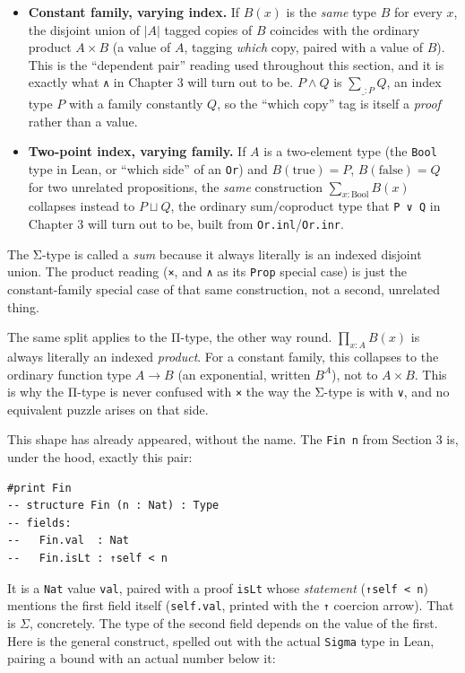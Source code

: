 \begin{itemize}
\tightlist
\item
  \textbf{Constant family, varying index.} If \(B(x)\) is the \emph{same} type \(B\) for every \(x\), the disjoint union of \(|A|\) tagged copies of \(B\) coincides with the ordinary product \(A \times B\) (a value of \(A\), tagging \emph{which} copy, paired with a value of \(B\)). This is the ``dependent pair'' reading used throughout this section, and it is exactly what \texttt{∧} in Chapter 3 will turn out to be. \(P \wedge Q\) is \(\sum_{\_ : P} Q\), an index type \(P\) with a family constantly \(Q\), so the ``which copy'' tag is itself a \emph{proof} rather than a value.
\item
  \textbf{Two-point index, varying family.} If \(A\) is a two-element type (the \texttt{Bool} type in Lean, or ``which side'' of an \texttt{Or}) and \(B(\mathrm{true}) = P\), \(B(\mathrm{false}) = Q\) for two unrelated propositions, the \emph{same} construction \(\sum_{x:\mathrm{Bool}} B(x)\) collapses instead to \(P \sqcup Q\), the ordinary sum/coproduct type that \texttt{P ∨ Q} in Chapter 3 will turn out to be, built from \texttt{Or.inl}/\texttt{Or.inr}.
\end{itemize}

The Σ-type is called a \emph{sum} because it always literally is an indexed disjoint union. The product reading (\texttt{×}, and \texttt{∧} as its \texttt{Prop} special case) is just the constant-family special case of that same construction, not a second, unrelated thing.

The same split applies to the Π-type, the other way round. \(\prod_{x:A} B(x)\) is always literally an indexed \emph{product}. For a constant family, this collapses to the ordinary function type \(A \to B\) (an exponential, written \(B^A\)), not to \(A \times B\). This is why the Π-type is never confused with \texttt{×} the way the Σ-type is with \texttt{∨}, and no equivalent puzzle arises on that side.

This shape has already appeared, without the name. The \texttt{Fin n} from Section 3 is, under the hood, exactly this pair:

\begin{lstlisting}
#print Fin
-- structure Fin (n : Nat) : Type
-- fields:
--   Fin.val  : Nat
--   Fin.isLt : ↑self < n
\end{lstlisting}

It is a \texttt{Nat} value \texttt{val}, paired with a proof \texttt{isLt} whose \emph{statement} (\texttt{↑self < n}) mentions the first field itself (\texttt{self.val}, printed with the \texttt{↑} coercion arrow). That is \(\Sigma\), concretely. The type of the second field depends on the value of the first. Here is the general construct, spelled out with the actual \texttt{Sigma} type in Lean, pairing a bound with an actual number below it:

